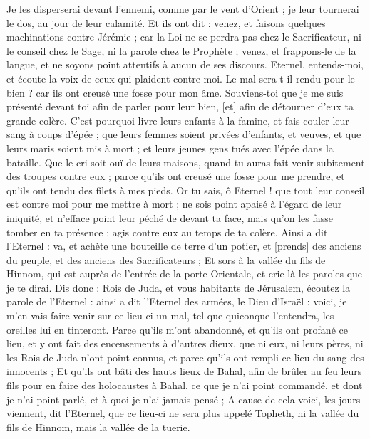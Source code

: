 \begin{multicols}{2}
Je les disperserai devant l'ennemi, comme par le vent d'Orient ; je leur tournerai le dos, au jour de leur calamité.
Et ils ont dit : venez, et faisons quelques machinations contre Jérémie ; car la Loi ne se perdra pas chez le Sacrificateur, ni le conseil chez le Sage, ni la parole chez le Prophète ; venez, et frappons-le de la langue, et ne soyons point attentifs à aucun de ses discours.
Eternel, entends-moi, et écoute la voix de ceux qui plaident contre moi.
Le mal sera-t-il rendu pour le bien ? car ils ont creusé une fosse pour mon âme. Souviens-toi que je me suis présenté devant toi afin de parler pour leur bien, [et] afin de détourner d'eux ta grande colère.
C'est pourquoi livre leurs enfants à la famine, et fais couler leur sang à coups d'épée ; que leurs femmes soient privées d'enfants, et veuves, et que leurs maris soient mis à mort ; et leurs jeunes gens tués avec l'épée dans la bataille.
Que le cri soit ouï de leurs maisons, quand tu auras fait venir subitement des troupes contre eux ; parce qu'ils ont creusé une fosse pour me prendre, et qu'ils ont tendu des filets à mes pieds.
Or tu sais, ô Eternel ! que tout leur conseil est contre moi pour me mettre à mort ; ne sois point apaisé à l'égard de leur iniquité, et n'efface point leur péché de devant ta face, mais qu'on les fasse tomber en ta présence ; agis contre eux au temps de ta colère.
\VerseOne{}Ainsi a dit l'Eternel : va, et achète une bouteille de terre d'un potier, et [prends] des anciens du peuple, et des anciens des Sacrificateurs ;
Et sors à la vallée du fils de Hinnom, qui est auprès de l'entrée de la porte Orientale, et crie là les paroles que je te dirai.
Dis donc : Rois de Juda, et vous habitants de Jérusalem, écoutez la parole de l'Eternel : ainsi a dit l'Eternel des armées, le Dieu d'Israël : voici, je m'en vais faire venir sur ce lieu-ci un mal, tel que quiconque l'entendra, les oreilles lui en tinteront.
Parce qu'ils m'ont abandonné, et qu'ils ont profané ce lieu, et y ont fait des encensements à d'autres dieux, que ni eux, ni leurs pères, ni les Rois de Juda n'ont point connus, et parce qu'ils ont rempli ce lieu du sang des innocents ;
Et qu'ils ont bâti des hauts lieux de Bahal, afin de brûler au feu leurs fils pour en faire des holocaustes à Bahal, ce que je n'ai point commandé, et dont je n'ai point parlé, et à quoi je n'ai jamais pensé ;
A cause de cela voici, les jours viennent, dit l'Eternel, que ce lieu-ci ne sera plus appelé Topheth, ni la vallée du fils de Hinnom, mais la vallée de la tuerie.

\end{multicols}
